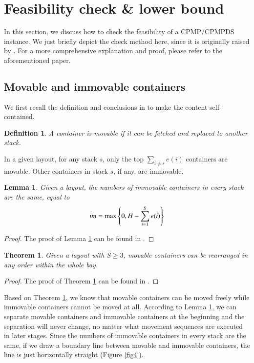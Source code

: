 \documentclass[review,3p,times,authoryear,12pt]{elsarticle}
\newtheorem{theorem}{Theorem}
\newtheorem{definition}{Definition}
\newtheorem{lemma}{Lemma}
\begin{document}
\section{Feasibility check \& lower bound}
\label{sec:cf}

In this section, we discuss how to check the feasibility of a CPMP/CPMPDS instance. We just briefly depict the check method here, since it is originally raised by \cite{Wang2013Check}. For a more comprehensive explanation and proof, please refer to the aforementioned paper.

\subsection{Movable and immovable containers}
We first recall the definition and conclusions in \cite{Wang2013Check} to make the content self-contained.

\begin{definition}
\label{def:1}
A container is movable if it can be fetched and replaced to another stack.
\end{definition}

In a given layout, for any stack $s$, only the top $\sum\limits_{i\neq s}e(i)$ containers are movable. Other containers in stack $s$, if any, are immovable.

\begin{lemma}
\label{lem:1}
Given a layout, the numbers of immovable containers in every stack are the same, equal to
\begin{equation}
\id{im}=\max\left\{0, H-\sum_{i=1}^S e(i)\right\}
\end{equation}
\end{lemma}
\begin{proof}
The proof of Lemma \ref{lem:1} can be found in \cite{Wang2013Check}.
\end{proof}

\begin{theorem}
\label{the:1}
Given a layout with $S\ge3$, movable containers can be rearranged in any order within the whole bay.
\end{theorem}
\begin{proof}
The proof of Theorem \ref{the:1} can be found in \cite{Wang2013Check}.
\end{proof}

Based on Theorem \ref{the:1}, we know that movable containers can be moved freely while immovable containers cannot be moved at all. According to Lemma \ref{lem:1}, we can separate movable containers and immovable containers at the beginning and the separation will never change, no matter what movement sequences are executed in later stages.
Since the numbers of immovable containers in every stack are the same, if we draw a boundary line between movable and immovable containers, the line is just horizontally straight (Figure \ref{fig4}).
\end{document}
